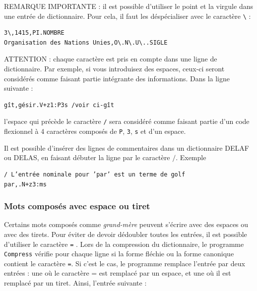 \bigskip
\noindent REMARQUE IMPORTANTE : il est possible d’utiliser le point et la virgule dans une
entrée de dictionnaire. Pour cela, il faut les déspécialiser avec le caractère
\verb+\+ \index{\verbt{\textbackslash,}}\index{\verbt{\textbackslash~}}:

\bigskip
\begin{verbatim}
3\,1415,PI.NOMBRE
Organisation des Nations Unies,O\.N\.U\..SIGLE
\end{verbatim}


\bigskip
\noindent ATTENTION : chaque caractère est pris en compte dans une ligne de dictionnaire. Par
exemple, si vous introduisez des espaces, ceux-ci seront considérés comme faisant partie
intégrante des informations. Dans la ligne suivante :


\begin{verbatim}
gît,gésir.V+z1:P3s /voir ci-gît
\end{verbatim}

\bigskip \noindent l’espace qui précède le caractère \verb+/+ sera considéré comme faisant partie
d’un code flexionnel à 4 caractères composés de \verb+P+, \verb+3+, \verb+s+ et d’un espace.


\bigskip \noindent Il est possible d’insérer des lignes de commentaires dans un dictionnaire DELAF
ou DELAS, en faisant débuter la ligne par le caractère $/$. Exemple

\bigskip
\begin{verbatim}
/ L’entrée nominale pour ’par’ est un terme de golf
par,.N+z3:ms
\end{verbatim}


\subsubsection{Mots composés avec espace ou tiret}

\index{\verbc{=}}\index{\verbt{\textbackslash=}}

Certains mots composés comme \textit{grand-mère} peuvent s’écrire avec des espaces ou avec
des tirets. Pour éviter de devoir dédoubler toutes les entrées, il est possible d’utiliser 
le caractère \verb+=+ . Lors de la compression du dictionnaire, le programme \verb+Compress+
 vérifie pour chaque ligne
si la forme fléchie ou la forme canonique contient le caractère \verb+=+. Si c’est le cas, le
programme remplace l’entrée par deux entrées : une où le caractère = est remplacé par un espace,
et une où il est remplacé par un tiret. Ainsi, l’entrée suivante :


